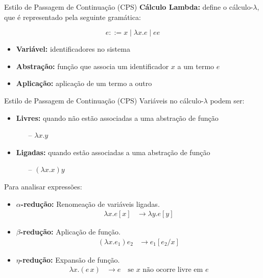 \begin{frame}{Estilo de Passagem de Continuação (CPS)}
  \textbf{Cálculo Lambda:}
   define o cálculo-$\lambda$, que é representado pela seguinte gramática:

  \begin{equation}
    e ::= x \mid \lambda x. e \mid e e\nonumber
  \end{equation}

  \begin{itemize}
    \item \textbf{Variável:} identificadores no sistema
    \item \textbf{Abstração:} função que associa um identificador $x$ a um termo $e$
    \item \textbf{Aplicação:} aplicação de um termo a outro
  \end{itemize}
\end{frame}

\begin{frame}{Estilo de Passagem de Continuação (CPS)}
  Variáveis no cálculo-$\lambda$ podem ser:
  \begin{itemize}
    \item \textbf{Livres:} quando não estão associadas a uma abstração de função
          \begin{itemize}
            \item[--] $\lambda x. y$
          \end{itemize}
    \item \textbf{Ligadas:} quando estão associadas a uma abstração de função
          \begin{itemize}
            \item[--] $(\lambda x. x) y$
          \end{itemize}
    \item[]
  \end{itemize}

  Para analisar expressões:
  \begin{itemize}
    \item \textbf{$\alpha$-redução:} Renomeação de variáveis ligadas.
          \begin{align}
            \lambda x . e[x] & \rightarrow \lambda y . e[y]\nonumber
          \end{align}

    \item \textbf{$\beta$-redução:} Aplicação de função.
          \begin{align}
            (\lambda x . e_1) e_2 & \rightarrow e_1 [e_2 / x]\nonumber
          \end{align}

    \item \textbf{$\eta$-redução:} Expansão de função.
          \begin{align}
            \lambda x . (e \, x) & \rightarrow e \quad \text{se } x \text{ não ocorre livre em } e\nonumber
          \end{align}
  \end{itemize}
\end{frame}
